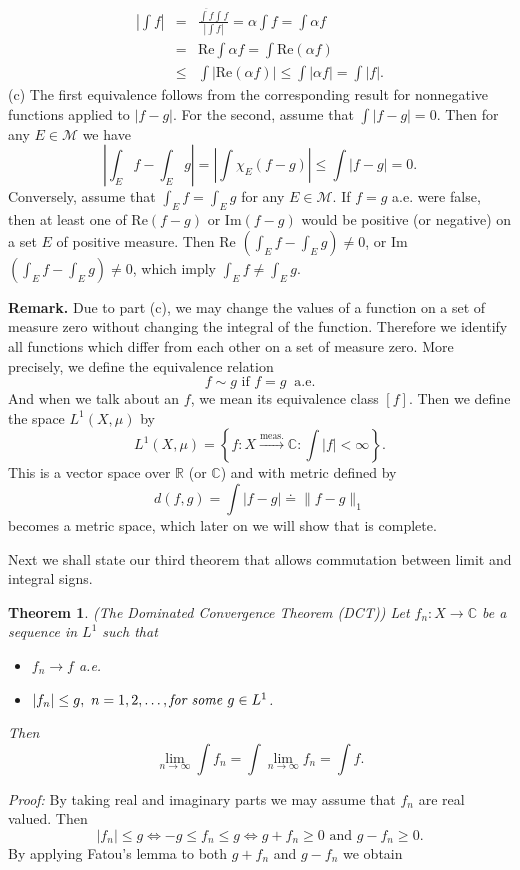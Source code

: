 \documentclass[12pt]{report}
\newtheorem{theorem}{Theorem}[section]
\begin{document}
\begin{eqnarray*}
\left | \int f \right | &=& \frac{\overline{\int f} \int f}{|\int f|} = \alpha
\int f = \int
\alpha f\\ &=&\mbox{Re} \int \alpha f = \int \mbox{Re} (\alpha f)\\ 
&\le& \int |\mbox{Re}(\alpha f)| \le \int |\alpha f| = \int |f|.
\end{eqnarray*} (c)  The first equivalence follows from the
corresponding result for nonnegative functions applied to $|f-g|$.  For
the second, assume  that $\int |f-g| = 0$.  Then for any $E \in
\mathcal{M}$ we have
\[
\left | \int_E f - \int_E g \right | = \left |\int \chi_E (f-g) \right | \le \int
|f-g| = 0.
\] Conversely, assume that $\int_E f = \int_E g$ for any $E \in
\mathcal{M}$.  If $f = g$ a.e. were false, then at least one of Re$(f-g)$ or
Im$(f-g)$ would be  positive (or negative) on a set $E$ of positive
measure.  Then Re
$\left ( \int_E f - \int_E g\right ) \ne 0$, or Im$\left ( \int_E f - \int_E g
\right ) \ne 0$, which imply $\int_E f \ne \int_E g$. 


\bigskip
\noindent
\textbf{Remark.}  Due to part (c), we may change the values of a
function on a set of measure zero without changing the integral of the
function.  Therefore we identify all functions  which differ from each
other on a set of measure zero.  More precisely, we define the
equivalence relation
\[ f \sim g \mbox{ if } f = g \ \mbox{ a.e.}
\] And when we talk about an $f$, we mean its equivalence class $[f]$. 
Then we define the space $L^1(X, \mu)$ by
\[ L^1 (X, \mu) = \left \{f: X \stackrel{\mbox{meas.}}{\longrightarrow}
\mathbb{C}: \int |f| < \infty \right \}.
\] This is a vector space over $\mathbb{R}$ (or $\mathbb{C}$) and with 
metric defined by 
\[ d(f, g) = \int |f-g| \doteq \|f-g\|_1
\] becomes a metric space, which later on we will show that is
complete.


Next we shall state our third theorem that allows commutation
between limit and integral signs.


\begin{theorem} (The Dominated Convergence Theorem (DCT))
Let
$f_n: X
\longrightarrow
\mathbb{C}$ be a sequence in $L^1$ such that
\begin{itemize}
\item[a.]  $f_n \longrightarrow f$ a.e.
\item[b.]  $|f_n| \le g, \ n = 1, 2, \dots, \mbox{\textit{for some} } g \in
L^1$.
\end{itemize}
Then
\[
\lim_{n \to \infty} \int f_n = \int \lim_{n \to \infty} f_n = \int f.
\]
\end{theorem}
\textit{Proof:}  By taking real and imaginary parts we may assume that
$f_n$ are real valued.  Then
\[ |f_n| \le g \Longleftrightarrow - g \le f_n \le g \Longleftrightarrow g
+ f_n \ge 0
\mbox{ and } g - f_n \ge 0.
\] By applying Fatou's lemma to both $g + f_n$ and $g - f_n$ we obtain
\end{document}
